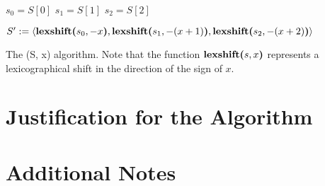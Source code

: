 \documentclass[12pt,a4paper,fleqn]{article}
\begin{document}
	\vspace{1cm}
	\begin{algorithm}[H] \label{alg2decode}
		\SetAlgoLined
		$s_0 = S[0]$\;
		$s_1 = S[1]$\;
		$s_2 = S[2]$\;
		
		\majorspace
		
		$S^\prime := \langle \textbf{lexshift(}s_0, -x\textbf{)}, \textbf{lexshift(}s_1, -(x+1)\textbf{)}, \textbf{lexshift(}s_2, -(x+2)\textbf{)} \rangle$\;
		
		\majorspace	
		
		\;
		
		\majorspace
		\caption{The \decodefn(S, x) algorithm. Note that the function $\textbf{lexshift(}s, x\textbf{)}$ represents a lexicographical shift in the direction of the sign of $x$. }
	\end{algorithm}

	\section{Justification for the Algorithm}
	
	\section{Additional Notes}	
	
\end{document}
